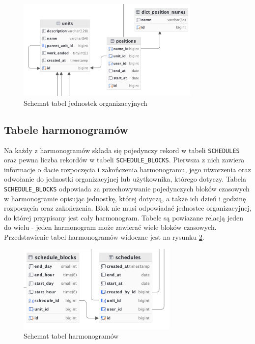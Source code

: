 \begin{figure}[H]
    \centering
    \includegraphics[width=0.8\textwidth]{graf/unitsTable.png}
    \caption{Schemat tabel jednostek organizacyjnych}
    \label{fig:organizationalUnitsTable}
\end{figure}

\subsection{Tabele harmonogramów}
\label{ss:harmonogramy}


Na każdy z harmonogramów składa się pojedynczy rekord w tabeli \texttt{SCHEDULES} oraz pewna liczba rekordów w tabeli \texttt{SCHEDULE\_BLOCKS}. Pierwsza z nich zawiera informacje o dacie rozpoczęcia i zakończenia harmonogramu, jego utworzenia oraz odwołanie do jednostki organizacyjnej lub użytkownika, którego dotyczy. Tabela \texttt{SCHEDULE\_BLOCKS} odpowiada za przechowywanie pojedynczych bloków czasowych w harmonogramie opisując jednostkę, której dotyczą, a także ich dzień i godzinę rozpoczęcia oraz zakończenia. Blok nie musi odpowiadać jednostce organizacyjnej, do której przypisany jest cały harmonogram. Tabele są powiazane relacją jeden do wielu - jeden harmonogram może zawierać wiele bloków czasowych. Przedstawienie tabel harmonogramów widoczne jest na rysunku \ref{fig:schedulesTable}.

\begin{figure}[H]
    \centering
    \includegraphics[width=0.7\textwidth]{graf/scheduleTable.png}
    \caption{Schemat tabel harmonogramów}
    \label{fig:schedulesTable}
\end{figure}

